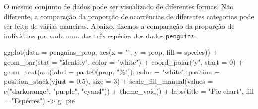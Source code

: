 \documentclass[
]{book}
\newenvironment{Shaded}{\begin{snugshade}}{\end{snugshade}}
\newcommand{\AttributeTok}[1]{\textcolor[rgb]{0.61,0.61,0.61}{#1}}
\newcommand{\DecValTok}[1]{\textcolor[rgb]{0.06,0.06,0.06}{#1}}
\newcommand{\FloatTok}[1]{\textcolor[rgb]{0.06,0.06,0.06}{#1}}
\newcommand{\FunctionTok}[1]{\textcolor[rgb]{0,0,0}{#1}}
\newcommand{\NormalTok}[1]{#1}
\newcommand{\OtherTok}[1]{\textcolor[rgb]{0.37,0.37,0.37}{#1}}
\newcommand{\SpecialCharTok}[1]{\textcolor[rgb]{0,0,0}{#1}}
\newcommand{\StringTok}[1]{\textcolor[rgb]{0.5,0.5,0.5}{#1}}
\begin{document}
O mesmo conjunto de dados pode ser visualizado de diferentes formas. Não diferente, a comparação da proporção de ocorrências de diferentes categorias pode ser feita de várias maneiras. Abaixo, fizemos a comparação da proporção de indivíduos por cada uma das três espécies dos dados \texttt{penguins}.

\begin{Shaded}
\begin{Highlighting}[]


\FunctionTok{ggplot}\NormalTok{(}\AttributeTok{data =}\NormalTok{ penguins\_prop, }\FunctionTok{aes}\NormalTok{(}\AttributeTok{x =} \StringTok{""}\NormalTok{, }\AttributeTok{y =}\NormalTok{ prop, }\AttributeTok{fill =}\NormalTok{ species)) }\SpecialCharTok{+} 
  \FunctionTok{geom\_bar}\NormalTok{(}\AttributeTok{stat =} \StringTok{"identity"}\NormalTok{, }\AttributeTok{color =} \StringTok{"white"}\NormalTok{) }\SpecialCharTok{+}
  \FunctionTok{coord\_polar}\NormalTok{(}\StringTok{"y"}\NormalTok{, }\AttributeTok{start =} \DecValTok{0}\NormalTok{) }\SpecialCharTok{+}
  \FunctionTok{geom\_text}\NormalTok{(}\FunctionTok{aes}\NormalTok{(}\AttributeTok{label =} \FunctionTok{paste0}\NormalTok{(prop, }\StringTok{"\%"}\NormalTok{)), }\AttributeTok{color =} \StringTok{"white"}\NormalTok{, }
            \AttributeTok{position =} \FunctionTok{position\_stack}\NormalTok{(}\AttributeTok{vjust =} \FloatTok{0.5}\NormalTok{), }\AttributeTok{size =} \DecValTok{3}\NormalTok{) }\SpecialCharTok{+}
  \FunctionTok{scale\_fill\_manual}\NormalTok{(}\AttributeTok{values =} \FunctionTok{c}\NormalTok{(}\StringTok{"darkorange"}\NormalTok{, }\StringTok{"purple"}\NormalTok{, }\StringTok{"cyan4"}\NormalTok{)) }\SpecialCharTok{+}
  \FunctionTok{theme\_void}\NormalTok{() }\SpecialCharTok{+}
  \FunctionTok{labs}\NormalTok{(}\AttributeTok{title =} \StringTok{"Pie chart"}\NormalTok{, }\AttributeTok{fill =} \StringTok{"Espécies"}\NormalTok{) }\OtherTok{{-}\textgreater{}}\NormalTok{ g\_pie}


\end{Highlighting}
\end{Shaded}
\end{document}

